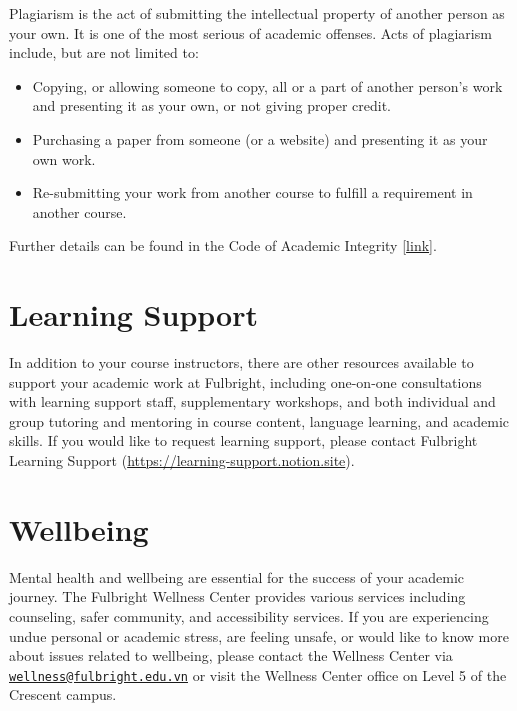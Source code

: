 \documentclass[
]{book}
\theoremstyle{definition}
\theoremstyle{definition}
\theoremstyle{definition}
\theoremstyle{definition}
\theoremstyle{remark}
\begin{document}
Plagiarism is the act of submitting the intellectual property of another person as your own. It is one of the most serious of academic offenses. Acts of plagiarism include, but are not limited to:

\begin{itemize}
\item
  Copying, or allowing someone to copy, all or a part of another person's work and presenting it as your own, or not giving proper credit.
\item
  Purchasing a paper from someone (or a website) and presenting it as your own work.
\item
  Re-submitting your work from another course to fulfill a requirement in another course.
\end{itemize}

Further details can be found in the Code of Academic Integrity {[}\href{https://fulbright.edu.vn/articles/Code\%20of\%20Academic\%20Integrity/Code\%20of\%20Academic\%20Integrity_\%20Excom\%20Endorsed.pdf}{link}{]}.

\hypertarget{learning-support}{%
\section*{Learning Support}\label{learning-support}}

In addition to your course instructors, there are other resources available to support your
academic work at Fulbright, including one-on-one consultations with learning support staff,
supplementary workshops, and both individual and group tutoring and mentoring in course
content, language learning, and academic skills. If you would like to request learning support,
please contact Fulbright Learning Support (\url{https://learning-support.notion.site}).

\hypertarget{wellbeing}{%
\section*{Wellbeing}\label{wellbeing}}

Mental health and wellbeing are essential for the success of your academic journey. The
Fulbright Wellness Center provides various services including counseling, safer community,
and accessibility services. If you are experiencing undue personal or academic stress, are
feeling unsafe, or would like to know more about issues related to wellbeing, please contact
the Wellness Center via \href{mailto:wellness@fulbright.edu.vn}{\nolinkurl{wellness@fulbright.edu.vn}} or visit the Wellness Center office on
Level 5 of the Crescent campus.
\end{document}
